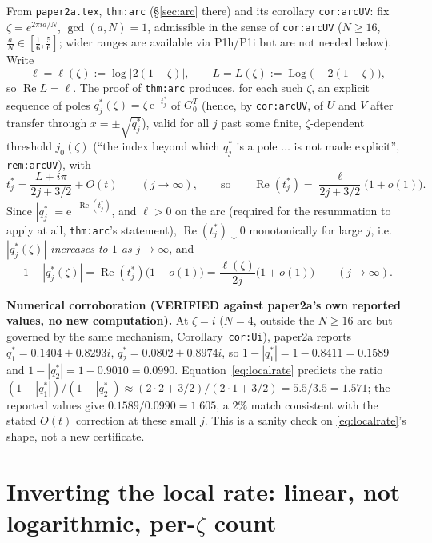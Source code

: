 \documentclass[11pt]{article}
\theoremstyle{remark}
\newcommand{\e}{\mathrm e}
\begin{document}
From \texttt{paper2a.tex}, \texttt{thm:arc} (\S\ref{sec:arc} there) and its corollary
\texttt{cor:arcUV}: fix $\zeta=e^{2\pi ia/N}$, $\gcd(a,N)=1$, admissible in the sense of
\texttt{cor:arcUV} ($N\ge16$, $\frac aN\in[\frac16,\frac56]$; wider ranges are available via
P1h/P1i but are not needed below). Write
\[
   \ell=\ell(\zeta):=\log\bigl|2(1-\zeta)\bigr|,\qquad L=L(\zeta):=\operatorname{Log}\bigl(-2(1-\zeta)\bigr),
\]
so $\operatorname{Re}L=\ell$. The proof of \texttt{thm:arc} produces, for each such $\zeta$, an
explicit sequence of poles $q^\ast_j(\zeta)=\zeta\,\e^{-t^\ast_j}$ of $G^T_0$ (hence, by
\texttt{cor:arcUV}, of $U$ and $V$ after transfer through $x=\pm\sqrt{q^\ast_j}$), valid for all $j$
past some finite, $\zeta$-dependent threshold $j_0(\zeta)$ (``the index beyond which $q^\ast_j$ is a
pole $\ldots$ is not made explicit'', \texttt{rem:arcUV}), with
\[
   t^\ast_j=\frac{L+i\pi}{2j+3/2}+O(t)\qquad(j\to\infty),\qquad\text{so}\qquad
   \operatorname{Re}(t^\ast_j)=\frac{\ell}{2j+3/2}\bigl(1+o(1)\bigr).
\]
Since $|q^\ast_j|=\e^{-\operatorname{Re}(t^\ast_j)}$, and $\ell>0$ on the arc (required for the
resummation to apply at all, \texttt{thm:arc}'s statement), $\operatorname{Re}(t^\ast_j)\downarrow0$
monotonically for large $j$, i.e.\ \emph{$|q^\ast_j(\zeta)|$ increases to $1$ as $j\to\infty$}, and
\begin{equation}\label{eq:localrate}
   1-|q^\ast_j(\zeta)|=\operatorname{Re}(t^\ast_j)\bigl(1+o(1)\bigr)=\frac{\ell(\zeta)}{2j}\bigl(1+o(1)\bigr)\qquad(j\to\infty).
\end{equation}

\noindent\textbf{Numerical corroboration (VERIFIED against paper2a's own reported values, no new
computation).} At $\zeta=i$ ($N=4$, outside the $N\ge16$ arc but governed by the same mechanism,
Corollary~\texttt{cor:Ui}), paper2a reports $q^\ast_1=0.1404+0.8293i$, $q^\ast_2=0.0802+0.8974i$, so
$1-|q^\ast_1|=1-0.8411=0.1589$ and $1-|q^\ast_2|=1-0.9010=0.0990$. Equation~\eqref{eq:localrate}
predicts the ratio $(1-|q^\ast_1|)/(1-|q^\ast_2|)\approx(2\cdot2+3/2)/(2\cdot1+3/2)=5.5/3.5=1.571$; the
reported values give $0.1589/0.0990=1.605$, a $2\%$ match consistent with the stated $O(t)$ correction
at these small $j$. This is a sanity check on \eqref{eq:localrate}'s shape, not a new certificate.

\section{Inverting the local rate: linear, not logarithmic, per-$\zeta$ count}\label{sec:invert}
\end{document}
